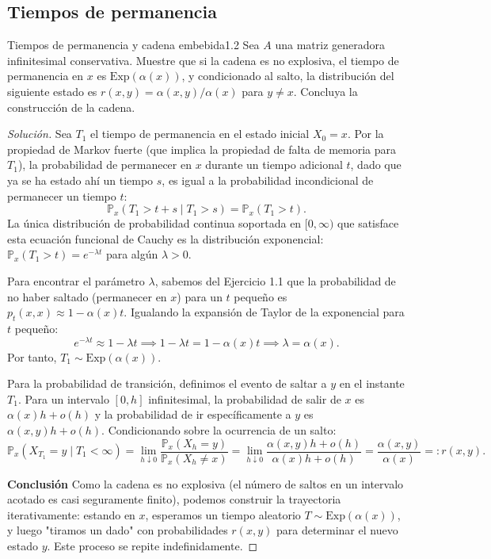 \documentclass[10pt,a4paper]{article}
\begin{document}
\newpage

\subsection{Tiempos de permanencia}

\begin{ejercicio}{Tiempos de permanencia y cadena embebida}{1.2}
    Sea $A$ una matriz generadora infinitesimal conservativa. Muestre que si la cadena es no explosiva, el tiempo de permanencia en $x$ es $\text{Exp}(\alpha(x))$, y condicionado al salto, la distribución del siguiente estado es $r(x,y) = \alpha(x,y) / \alpha(x)$ para $y \neq x$. Concluya la construcción de la cadena.
\end{ejercicio}

\begin{proof}[Solución]
    Sea $T_1$ el tiempo de permanencia en el estado inicial $X_0 = x$. Por la propiedad de Markov fuerte (que implica la propiedad de falta de memoria para $T_1$), la probabilidad de permanecer en $x$ durante un tiempo adicional $t$, dado que ya se ha estado ahí un tiempo $s$, es igual a la probabilidad incondicional de permanecer un tiempo $t$:
    \[ \mathbb{P}_x(T_1 > t + s \mid T_1 > s) = \mathbb{P}_x(T_1 > t). \]
    La única distribución de probabilidad continua soportada en $[0, \infty)$ que satisface esta ecuación funcional de Cauchy es la distribución exponencial: $\mathbb{P}_x(T_1 > t) = e^{-\lambda t}$ para algún $\lambda > 0$.
    
    Para encontrar el parámetro $\lambda$, sabemos del Ejercicio 1.1 que la probabilidad de no haber saltado (permanecer en $x$) para un $t$ pequeño es $p_t(x,x) \approx 1 - \alpha(x)t$.
    Igualando la expansión de Taylor de la exponencial para $t$ pequeño:
    \[ e^{-\lambda t} \approx 1 - \lambda t \implies 1 - \lambda t = 1 - \alpha(x)t \implies \lambda = \alpha(x). \]
    Por tanto, $T_1 \sim \text{Exp}(\alpha(x))$.

    Para la probabilidad de transición, definimos el evento de saltar a $y$ en el instante $T_1$. Para un intervalo $[0, h]$ infinitesimal, la probabilidad de salir de $x$ es $\alpha(x)h + o(h)$ y la probabilidad de ir específicamente a $y$ es $\alpha(x,y)h + o(h)$. Condicionando sobre la ocurrencia de un salto:
    \[ \mathbb{P}_x(X_{T_1} = y \mid T_1 < \infty) = \lim_{h \downarrow 0} \frac{\mathbb{P}_x(X_h = y)}{\mathbb{P}_x(X_h \neq x)} = \lim_{h \downarrow 0} \frac{\alpha(x,y)h + o(h)}{\alpha(x)h + o(h)} = \frac{\alpha(x,y)}{\alpha(x)} =: r(x,y). \]

    \textbf{Conclusión}
    Como la cadena es no explosiva (el número de saltos en un intervalo acotado es casi seguramente finito), podemos construir la trayectoria iterativamente: estando en $x$, esperamos un tiempo aleatorio $T \sim \text{Exp}(\alpha(x))$, y luego "tiramos un dado" con probabilidades $r(x,y)$ para determinar el nuevo estado $y$. Este proceso se repite indefinidamente.
\end{proof}
\end{document}
